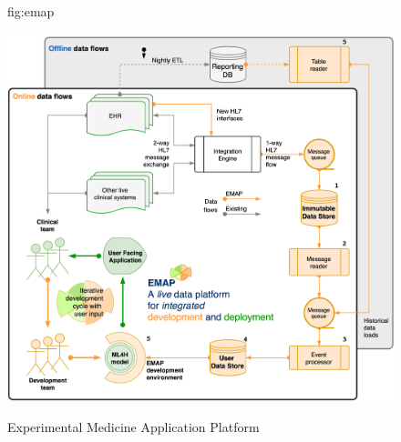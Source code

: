 \documentclass[pmlr,twocolumn,10pt]{jmlr} %
\begin{document}
\begin{figure}[htbp]

\floatconts
  {fig:emap}
  {\caption{Experimental Medicine Application Platform}}
  {\includegraphics[width=1.0\linewidth]{images/emap-summary-emap-summary.png}}
\end{figure}
\end{document}
